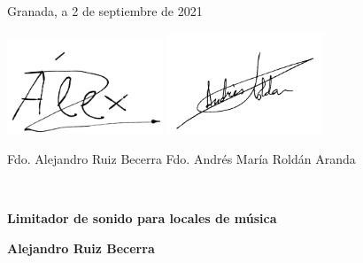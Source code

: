 \vspace*{1cm}

\begin{center}
Granada, a 2 de septiembre de 2021
\par\end{center}

\bigskip
\bigskip

\begin{center}
\hspace{0cm}
\includegraphics[width=0.35\textwidth]{imagenes/firmaAlumno.jpg}
\hspace{3cm}
\includegraphics[width=0.35\textwidth]{imagenes/firmaTutor.png}
\end{center}

\begin{doublespace}
\begin{center}
\hspace{0cm}Fdo. Alejandro Ruiz Becerra \hspace{3cm} Fdo. Andrés María Roldán Aranda
\end{center}
\end{doublespace}
~

\clearpage
{}
\noindent
\thispagestyle{empty}


\vspace{-1.48cm}
\begin{center}
    \textbf{\Large Limitador de sonido para locales de música}
\par\end{center}{\Large \par}

\begin{center}
    \textbf{\large Alejandro Ruiz Becerra}
    \par\end{center}{\large \par}

